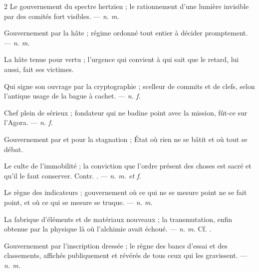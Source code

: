\begin{multicols}{2}
 Le gouvernement du spectre hertzien ; le rationnement d'une lumière invisible par des comités fort visibles. —  \textit{n. m.}

 Gouvernement par la hâte ; régime ordonné tout entier à décider promptement. —  \textit{n. m.}

 La hâte tenue pour vertu ; l'urgence qui convient à qui sait que le retard, lui aussi, fait ses victimes.

 Qui signe son ouvrage par la cryptographie ; scelleur de commits et de clefs, selon l'antique usage de la bague à cachet. —  \textit{n. f.}

 Chef plein de sérieux ; fondateur qui ne badine point avec la mission, fût-ce sur l'Agora. —  \textit{n. f.}

 Gouvernement par et pour la stagnation ; État où rien ne se bâtit et où tout se débat.

 Le culte de l'immobilité ; la conviction que l'ordre présent des choses est sacré et qu'il le faut conserver. Contr. . —  \textit{n. m. et f.}

 Le règne des indicateurs ; gouvernement où ce qui ne se mesure point ne se fait point, et où ce qui se mesure se truque. —  \textit{n. m.}

 La fabrique d'éléments et de matériaux nouveaux ; la transmutation, enfin obtenue par la physique là où l'alchimie avait échoué. —  \textit{n. m.} Cf. .

 Gouvernement par l'inscription dressée ; le règne des bancs d'essai et des classements, affichés publiquement et révérés de tous ceux qui les gravissent. —  \textit{n. m.}


\end{multicols}
